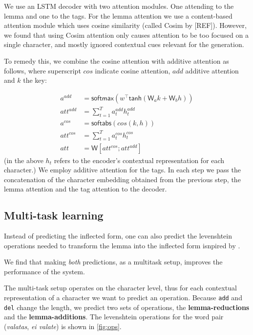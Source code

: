 \documentclass[11pt,a4paper]{article}
\begin{document}
We use an LSTM decoder with two attention modules. One attending to
the lemma and one to the tags. For the lemma attention we use a
content-based attention module which uses cosine similarity (called
Cosim by [REF]).  However, we found that using Cosim attention only
causes attention to be too focused on a single character, and mostly
ignored contextual cues relevant for the generation.

To remedy this, we combine the cosine attention with additive
attention as follows, where superscript $cos$ indicate cosine attention,
$add$ additive attention and $k$ the key:

\begin{align*}
	a^{add} & = \mathsf{softmax}(w^\top\mathsf{tanh}(\mathsf{W}_ak + \mathsf{W}_bh))\\
	att^{add} & = \sum_{t=1}^{T}a_t^{add}h_t^{add}\\
	a^{cos} & = \mathsf{softabs}(cos(k,h))\\
	att^{cos} & = \sum_{t=1}^{T}a_t^{cos}h_t^{cos}\\
	att & = \mathsf{W}[att^{cos}; att^{add}]
\end{align*}
(in the above $h_t$ refers to the encoder's contextual representation for each character.)
We employ additive attention for the tags. In each step we pass the
concatenation of the character embedding obtained from the previous
step, the lemma attention and the tag attention to the decoder.


\subsection{Multi-task learning}

Instead of predicting the inflected form, one can also predict the
levenshtein operations needed to transform the lemma into the
inflected form isnpired by \cite{DBLP:conf/conll/MakarovRC17}.

We find that making \emph{both} predictions, as a multitask setup,
improves the performance of the system.

The multi-task setup operates on the character level, thus for each
contextual representation of a character we want to predict an
operation. Because \texttt{add} and \texttt{del} change the length, we
predict two sets of operations, the \textbf{lemma-reductions} and the
\textbf{lemma-additions}. The levenshtein operations for the word pair
(\emph{valatas}, \emph{ei valate}) is shown in \cref{fig:ops}.
\end{document}
